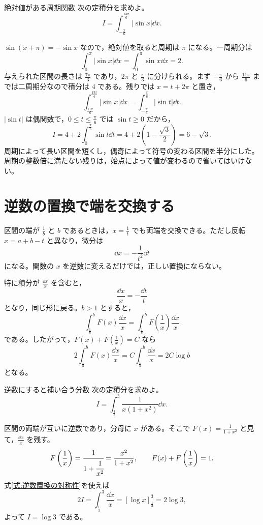 \begin{example}{絶対値がある周期関数}
次の定積分を求めよ。
\[
I=\int_{-\frac{\pi}{6}}^{\frac{13\pi}{6}}|\sin x|\dd x.
\]
\end{example}

$\sin(x+\pi)=-\sin x$ なので，絶対値を取ると周期は $\pi$ になる。一周期分は
\[
\int_0^\pi|\sin x|\dd x=\int_0^\pi\sin x\dd x=2.
\]
与えられた区間の長さは $\frac{7\pi}{3}$ であり，$2\pi$ と $\frac{\pi}{3}$ に分けられる。まず $-\frac{\pi}{6}$ から $\frac{11\pi}{6}$ までは二周期分なので積分は $4$ である。残りでは $x=t+2\pi$ と置き，
\[
\int_{\frac{11\pi}{6}}^{\frac{13\pi}{6}}|\sin x|\dd x
 =\int_{-\frac{\pi}{6}}^{\frac{\pi}{6}}|\sin t|\dd t.
\]
$|\sin t|$ は偶関数で，$0\leq t\leq\frac{\pi}{6}$ では $\sin t\geq0$ だから，
\[
I=4+2\int_0^{\frac{\pi}{6}}\sin t\dd t
 =4+2\left(1-\frac{\sqrt3}{2}\right)
 =6-\sqrt3.
\]
周期によって長い区間を短くし，偶奇によって符号の変わる区間を半分にした。周期の整数倍に満たない残りは，始点によって値が変わるので省いてはいけない。

\section{逆数の置換で端を交換する}\label{節:逆数対称性}

区間の端が $\frac1b$ と $b$ であるときは，$x=\frac1t$ でも両端を交換できる。ただし反転 $x=a+b-t$ と異なり，微分は
\[
\dd x=-\frac{1}{t^2}\dd t
\]
になる。関数の $x$ を逆数に変えるだけでは，正しい置換にならない。

特に積分が $\frac{\dd x}{x}$ を含むと，
\[
\frac{\dd x}{x}=-\frac{\dd t}{t}
\]
となり，同じ形に戻る。$b>1$ とすると，
\begin{equation}\label{式:逆数置換の対称性}
\int_{\frac1b}^b F(x)\frac{\dd x}{x}
 =\int_{\frac1b}^b F\left(\frac1x\right)\frac{\dd x}{x}
\end{equation}
である。したがって，$F(x)+F(\frac1x)=C$ なら
\[
2\int_{\frac1b}^b F(x)\frac{\dd x}{x}
 =C\int_{\frac1b}^b\frac{\dd x}{x}
 =2C\log b
\]
となる。

\begin{example}{逆数にすると補い合う分数}
次の定積分を求めよ。
\[
I=\int_{\frac13}^3\frac{1}{x(1+x^2)}\dd x.
\]
\end{example}

区間の両端が互いに逆数であり，分母に $x$ がある。そこで $F(x)=\frac{1}{1+x^2}$ と見て，$\frac{\dd x}{x}$ を残す。
\[
F\left(\frac1x\right)=\cfrac{1}{1+\cfrac{1}{x^2}}
 =\frac{x^2}{1+x^2},
\qquad F(x)+F\left(\frac1x\right)=1.
\]
式\eqref{式:逆数置換の対称性}を使えば
\[
2I=\int_{\frac13}^3\frac{\dd x}{x}
 =\left[\log x\right]_{\frac13}^3=2\log3,
\]
よって $I=\log3$ である。

